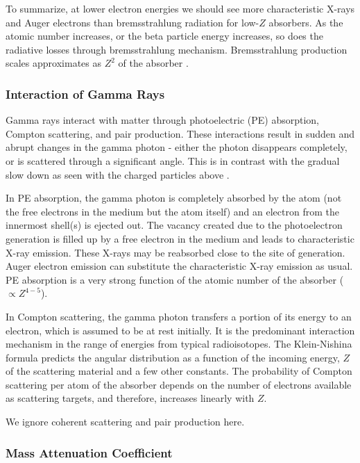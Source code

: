 \documentclass{article}
\begin{document}
To summarize, at lower electron energies we should see more characteristic X-rays and Auger electrons than bremsstrahlung radiation for low-$Z$ absorbers. As the atomic number increases, or the beta particle energy increases, so does 
the radiative losses through bremsstrahlung mechanism. Bremsstrahlung production scales approximates as $Z^2$ of the absorber \cite{Knoll2000}.

\subsubsection{Interaction of Gamma Rays}

Gamma rays interact with matter through photoelectric (PE) absorption, Compton scattering, and pair production. These interactions result in sudden and abrupt changes 
in the gamma photon - either the photon disappears completely, or is scattered through a significant angle. This is in contrast with the gradual slow down as seen with the charged particles above \cite{Knoll2000}.

In PE absorption, the gamma photon is completely absorbed by the atom (not the free electrons in the medium but the atom itself) and an electron from the innermost shell(s) is ejected out.
The vacancy created due to the photoelectron generation is filled up by a free electron in the medium and leads to characteristic X-ray emission. These X-rays may be reabsorbed close to the site of
generation. Auger electron emission can substitute the characteristic X-ray emission as usual. PE absorption is a very strong function of the atomic number of the absorber ($\propto Z^{4-5}$).


In Compton scattering, the gamma photon transfers a portion of its energy to an electron, which is assumed to be at rest initially. 
It is the predominant interaction mechanism in the range of energies from typical radioisotopes. The Klein-Nishina formula predicts the 
angular distribution as a function of the incoming energy, $Z$ of the scattering material and a few other constants. The probability of Compton 
scattering per atom of the absorber depends on the number of electrons available as scattering targets, and therefore, increases linearly with $Z$.

We ignore coherent scattering and pair production here. 

\subsubsection{Mass Attenuation Coefficient}
\end{document}
